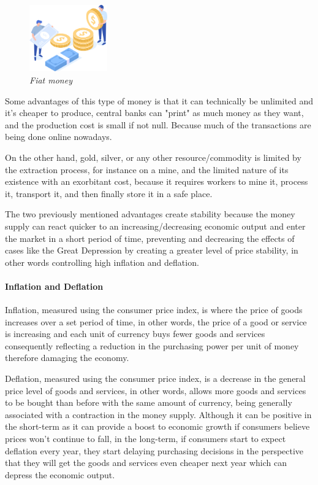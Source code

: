 \documentclass{article}
\begin{document}
\begin{figure}[H]
    \begin{center}
        \includegraphics[width=0.3\textwidth]{images/fiat_money.png}
        \caption{\textit{Fiat money}}
    \end{center}
\end{figure}

Some advantages of this type of money is that it can technically be unlimited and it's cheaper to produce, central banks can "print" as much money as they want, and the production cost is small if not null. Because much of the transactions are being done online nowadays.

On the other hand, gold, silver, or any other resource/commodity is limited by the extraction process, for instance on a mine, and the limited nature of its existence with an exorbitant cost, because it requires workers to mine it, process it, transport it, and then finally store it in a safe place.

The two previously mentioned advantages create stability because the money supply can react quicker to an increasing/decreasing economic output and enter the market in a short period of time, preventing and decreasing the effects of cases like the Great Depression by creating a greater level of price stability, in other words controlling high inflation and deflation.

\paragraph{Inflation and Deflation}

Inflation, measured using the consumer price index, is where the price of goods increases over a set period of time, in other words, the price of a good or service is increasing and each unit of currency buys fewer goods and services consequently reflecting a reduction in the purchasing power per unit of money therefore damaging the economy.

Deflation, measured using the consumer price index, is a decrease in the general price level of goods and services, in other words, allows more goods and services to be bought than before with the same amount of currency, being generally associated with a contraction in the money supply. Although it can be positive in the short-term as it can provide a boost to economic growth if consumers believe prices won’t continue to fall, in the long-term, if consumers start to expect deflation every year, they start delaying purchasing decisions in the perspective that they will get the goods and services even cheaper next year which can depress the economic output.
\end{document}
